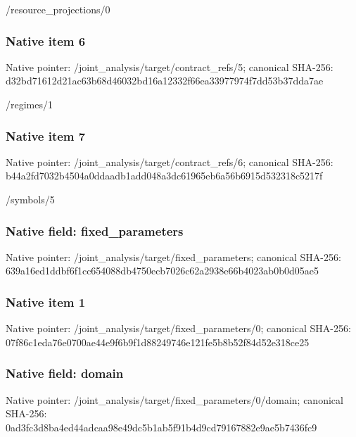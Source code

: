 \documentclass[10pt,a4paper]{article}
\begin{document}
\begingroup\raggedright\sloppy /\allowbreak{}resource\_\allowbreak{}projections/\allowbreak{}0\par\endgroup

\subsubsection{Native item 6}
Native pointer: /joint\_\allowbreak{}analysis/target/contract\_\allowbreak{}refs/5; canonical SHA-256: d32bd71612d21ac63b68d46032bd16a12332f66ea33977974f7dd53b37dda7ae

\begingroup\raggedright\sloppy /\allowbreak{}regimes/\allowbreak{}1\par\endgroup

\subsubsection{Native item 7}
Native pointer: /joint\_\allowbreak{}analysis/target/contract\_\allowbreak{}refs/6; canonical SHA-256: b44a2fd7032b4504a0ddaadb1add048a3dc61965eb6a56b6915d532318c5217f

\begingroup\raggedright\sloppy /\allowbreak{}symbols/\allowbreak{}5\par\endgroup

\subsubsection{Native field: fixed\_\allowbreak{}parameters}
Native pointer: /joint\_\allowbreak{}analysis/target/fixed\_\allowbreak{}parameters; canonical SHA-256: 639a16ed1ddbf6f1cc654088db4750ecb7026c62a2938e66b4023ab0b0d05ae5

\subsubsection{Native item 1}
Native pointer: /joint\_\allowbreak{}analysis/target/fixed\_\allowbreak{}parameters/0; canonical SHA-256: 07f86c1eda76e0700ae44e9f6b9f1d88249746e121fe5b8b52f84d52e318ce25

\subsubsection{Native field: domain}
Native pointer: /joint\_\allowbreak{}analysis/target/fixed\_\allowbreak{}parameters/0/domain; canonical SHA-256: 0ad3fc3d8ba4ed44adcaa98e49dc5b1ab5f91b4d9cd79167882e9ae5b7436fc9
\end{document}

